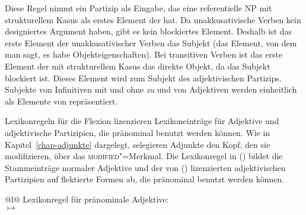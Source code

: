 {\noindent
Diese Regel nimmt ein Partizip als Eingabe, das eine referentielle NP mit strukturellem
Kasus als erstes Element der \subcatl hat. Da unakkusativische Verben kein designiertes
Argument haben, gibt es kein blockiertes Element. Deshalb ist das erste
Element der \subcatl unakkusativischer Verben das Subjekt (das Element, von dem
man sagt, es habe Objekteigenschaften). Bei transitiven Verben ist das
erste Element der \subcatl mit strukturellem Kasus das direkte Objekt, da das Subjekt
blockiert ist. Dieses Element wird zum Subjekt des adjektivischen Partizips.
Subjekte von Infinitiven mit und ohne \emph{zu} und von Adjektiven werden
einheitlich als Elemente von \subj repräsentiert. 

Lexikonregeln für die Flexion lizenzieren Lexikoneinträge für Adjektive und adjektivische
Partizipien, die pränominal benutzt werden können. Wie in Kapitel~\ref{chap-adjunkte}
dargelegt, selegieren Adjunkte den Kopf, den sie modifizieren, über das
\textsc{modified}"=Merkmal. Die Lexikonregel in () bildet die Stammeinträge
normaler Adjektive und der von () lizenzierten adjektivischen Partizipien
auf flektierte Formen ab, die pränominal benutzt werden können.
%
\eas
\label{lr-prenom-adj}
\begin{tabular}[t]{@{}l@{}}
Lexikonregel für pränominale Adjektive:\\
 $\mapsto$\\
\end{tabular}}
